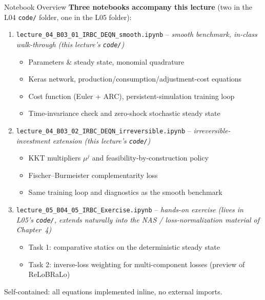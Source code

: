 \documentclass[aspectratio=169,11pt]{beamer}
\begin{document}
\begin{frame}{Notebook Overview}
\textbf{Three notebooks accompany this lecture} (two in the L04 \texttt{code/} folder, one in the L05 folder):

\vspace{0.5em}
\begin{enumerate}
    \item \texttt{lecture\_04\_B03\_01\_IRBC\_DEQN\_smooth.ipynb} -- \emph{smooth benchmark, in-class walk-through (this lecture's \texttt{code/})}
    \begin{itemize}\itemsep1pt\vspace{2pt}
        \item Parameters \& steady state, monomial quadrature
        \item Keras network, production/consumption/adjustment-cost equations
        \item Cost function (Euler + ARC), persistent-simulation training loop
        \item Time-invariance check and zero-shock stochastic steady state
    \end{itemize}

    \vspace{0.3em}
    \item \texttt{lecture\_04\_B03\_02\_IRBC\_DEQN\_irreversible.ipynb} -- \emph{irreversible-investment extension (this lecture's \texttt{code/})}
    \begin{itemize}\itemsep1pt\vspace{2pt}
        \item KKT multipliers $\mu^j$ and feasibility-by-construction policy
        \item Fischer--Burmeister complementarity loss
        \item Same training loop and diagnostics as the smooth benchmark
    \end{itemize}

    \vspace{0.3em}
    \item \texttt{lecture\_05\_B04\_05\_IRBC\_Exercise.ipynb} -- \emph{hands-on exercise (lives in L05's \texttt{code/}, extends naturally into the NAS / loss-normalization material of Chapter~4)}
    \begin{itemize}\itemsep1pt\vspace{2pt}
        \item Task 1: comparative statics on the deterministic steady state
        \item Task 2: inverse-loss weighting for multi-component losses (preview of ReLoBRaLo)
    \end{itemize}
\end{enumerate}

\vspace{0.4em}
{\small Self-contained: all equations implemented inline, no external imports.}
\end{frame}
\end{document}
